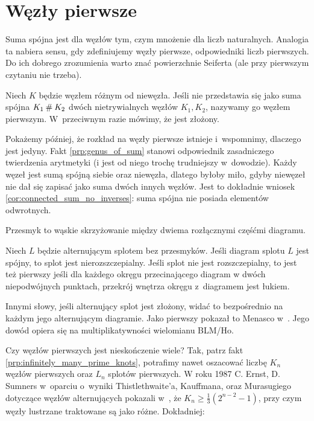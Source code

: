 
\section{Węzły pierwsze}
%
Suma spójna jest dla węzłów tym, czym mnożenie dla liczb naturalnych.
Analogia ta nabiera sensu, gdy zdefiniujemy węzły pierwsze, odpowiedniki liczb pierwszych.
Do ich dobrego zrozumienia warto znać powierzchnie Seiferta (ale przy pierwszym czytaniu nie trzeba).

\begin{definition}
\label{def:prime_knot}%
    Niech $K$ będzie węzłem różnym od niewęzła.
    Jeśli nie przedstawia się jako suma spójna $K_1 \mathbin{\#} K_2$
    dwóch nietrywialnych węzłów $K_1, K_2$, nazywamy go węzłem pierwszym.
    W~przeciwnym razie mówimy, że jest złożony.
\end{definition}

Pokażemy później, że rozkład na węzły pierwsze istnieje i~wspomnimy, dlaczego jest jedyny.
Fakt \ref{prp:genus_of_sum} stanowi odpowiednik zasadniczego twierdzenia arytmetyki (i jest od niego trochę trudniejszy w~dowodzie).
Każdy węzeł jest sumą spójną siebie oraz niewęzła, dlatego byłoby miło, gdyby niewęzeł nie dał się zapisać jako suma dwóch innych węzłów.
Jest to dokładnie wniosek \ref{cor:connected_sum_no_inverses}: suma spójna nie posiada elementów odwrotnych.


Przesmyk to wąskie skrzyżowanie między dwiema rozłącznymi częśćmi diagramu.

\begin{proposition}
%
    Niech $L$ będzie alternującym splotem bez przesmyków.
    Jeśli diagram splotu $L$ jest spójny, to splot jest nierozszczepialny.
    Jeśli splot nie jest rozszczepialny, to jest też pierwszy jeśli dla każdego okręgu przecinającego diagram w dwóch niepodwójnych punktach, przekrój wnętrza okręgu z~diagramem jest łukiem.
\end{proposition}

Innymi słowy, jeśli alternujący splot jest złożony, widać to bezpośrednio na każdym jego alternującym diagramie.
Jako pierwszy pokazał to Menasco w~\cite{menasco84}.
Jego dowód opiera się na multiplikatywności wielomianu BLM/Ho.

Czy węzłów pierwszych jest nieskończenie wiele?
Tak, patrz fakt \ref{prp:infinitely_many_prime_knots}, potrafimy nawet oszacować liczbę $K_n$ węzłów pierwszych oraz $L_n$ splotów pierwszych.
W roku 1987 C. Ernst, D. Sumners w~oparciu o~wyniki Thistlethwaite'a, Kauffmana, oraz Murasugiego dotyczące węzłów alternujących pokazali w~\cite{ernst87}, że $K_n \ge \frac 1 3 (2^{n- 2} - 1)$, przy czym węzły lustrzane traktowane są jako różne.
Dokładniej:

